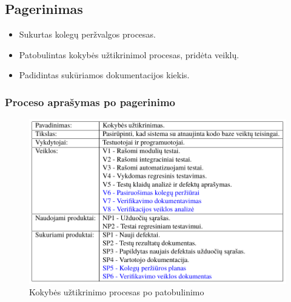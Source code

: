 \documentclass{VUMIFPSkursinis}
\begin{document}
		\subsection{Pagerinimas}
			\begin{itemize}
				\item{Sukurtas kolegų peržvalgos procesas.}
				\item{Patobulintas kokybės užtikrinimol procesas, pridėta veiklų.}
				\item{Padidintas sukūriamos dokumentacijos kiekis.}
			\end{itemize}
			\subsubsection{Proceso aprašymas po pagerinimo}
				\begin{figure}[!htbp]
					\includegraphics[scale=0.8]{img/kokybepo}
					\caption{Kokybės užtikrinimo procesas po patobulinimo} %
					\label{img:ProfilisPo}
				\end{figure}

\pagebreak
\end{document}
